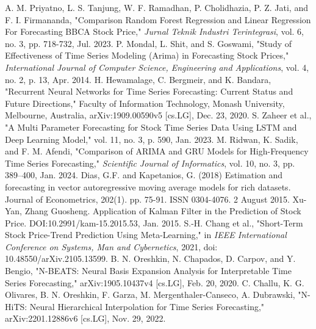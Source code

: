 \begin{thebibliography}{00}
     A. M. Priyatno, L. S. Tanjung, W. F. Ramadhan, P. Cholidhazia, P. Z. Jati, and F. I. Firmananda, "Comparison Random Forest Regression and Linear Regression For Forecasting BBCA Stock Price," \textit{Jurnal Teknik Industri Terintegrasi}, vol. 6, no. 3, pp. 718-732, Jul. 2023.
     P. Mondal, L. Shit, and S. Goswami, "Study of Effectiveness of Time Series Modeling (Arima) in Forecasting Stock Prices," \textit{International Journal of Computer Science, Engineering and Applications}, vol. 4, no. 2, p. 13, Apr. 2014.
     H. Hewamalage, C. Bergmeir, and K. Bandara, "Recurrent Neural Networks for Time Series Forecasting: Current Status and Future Directions," Faculty of Information Technology, Monash University, Melbourne, Australia, arXiv:1909.00590v5 [cs.LG], Dec. 23, 2020.
     S. Zaheer et al., "A Multi Parameter Forecasting for Stock Time Series Data Using LSTM and Deep Learning Model," vol. 11, no. 3, p. 590, Jan. 2023.
     M. Ridwan, K. Sadik, and F. M. Afendi, "Comparison of ARIMA and GRU Models for High-Frequency Time Series Forecasting," \textit{Scientific Journal of Informatics}, vol. 10, no. 3, pp. 389–400, Jan. 2024.
     Dias, G.F. and Kapetanios, G. (2018) Estimation and forecasting in vector autoregressive moving average models for rich datasets. Journal of Econometrics, 202(1). pp. 75-91. ISSN 0304-4076. 2 August 2015.
     Xu-Yan, Zhang Guosheng. Application of Kalman Filter in the Prediction of Stock Price. DOI:10.2991/kam-15.2015.53, Jan. 2015.
     S.-H. Chang et al., "Short-Term Stock Price-Trend Prediction Using Meta-Learning," in \textit{IEEE International Conference on Systems, Man and Cybernetics}, 2021, doi: 10.48550/arXiv.2105.13599.
     B. N. Oreshkin, N. Chapados, D. Carpov, and Y. Bengio, "N-BEATS: Neural Basis Expansion Analysis for Interpretable Time Series Forecasting," arXiv:1905.10437v4 [cs.LG], Feb. 20, 2020.
     C. Challu, K. G. Olivares, B. N. Oreshkin, F. Garza, M. Mergenthaler-Canseco, A. Dubrawski, "N-HiTS: Neural Hierarchical Interpolation for Time Series Forecasting," arXiv:2201.12886v6 [cs.LG], Nov. 29, 2022.
    

\end{thebibliography}
